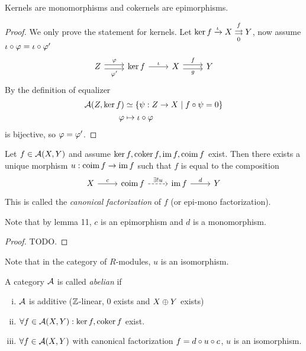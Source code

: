 \documentclass[a4paper]{report}
\begin{document}
\begin{lemm}
  Kernels are monomorphisms and cokernels are epimorphisms.
\end{lemm}
\begin{proof}
  We only prove the statement for kernels. Let $\ker f \xrightarrow \iota X \overunderset f0 \rightrightarrows Y$, now assume $\iota \circ \varphi = \iota \circ \varphi'$
  \[\begin{tikzcd}
Z \arrow[r, "\varphi", shift left] \arrow[r, "\varphi'"', shift right] & \ker f \arrow[r, "\iota"] & X \arrow[r, "f", shift left] \arrow[r, "g"', shift right] & Y
\end{tikzcd}\]
By the definition of equalizer \begin{align*}
  \mathcal{A}(Z, \ker f) &\simeq \{\psi: Z \to X \mid f \circ \psi = 0\} \\
  \varphi &\mapsto \iota \circ \varphi
\end{align*}
is bijective, so $\varphi = \varphi'$.
\end{proof}


\begin{thm}Let $f \in \mathcal{A}(X,Y)$ and assume $\ker f, \operatorname{coker} f, \operatorname{im} f, \operatorname{coim} f$ exist. Then there exists a unique morphism $u: \operatorname{coim} f \to \operatorname{im} f$ such that $f$ is equal to the composition
  \[\begin{tikzcd}
      X \arrow[r, "c"] & \coim f \arrow[r, "\ex!u", dashed] & \im f \arrow[r, "d"] & Y
    \end{tikzcd}\]
  This is called the \emph{canonical factorization} of $f$ (or epi-mono factorization).
\end{thm}
\begin{rem*}
Note that by lemma 11, $c$ is an epimorphism and $d$ is a monomorphism.
\end{rem*}
\begin{proof}TODO.

\end{proof}
Note that in the category of $R$-modules, $u$ is an isomorphism.


\begin{defi}
  A category $\mathcal{A}$ is called \emph{abelian} if
  \begin{enumerate}[(i)]
    \item $\mathcal{A}$ is additive ($\mathbb{Z}$-linear, 0 exists and $X \oplus Y$ exists)
    \item $\forall f \in \mathcal{A}(X,Y): \ker f, \operatorname{coker} f$ exist.
          \item $\forall f \in \mathcal{A}(X,Y)$ with canonical factorization $f = d \circ u \circ c$, $u$ is an isomorphism.
  \end{enumerate}
\end{defi}
\end{document}
